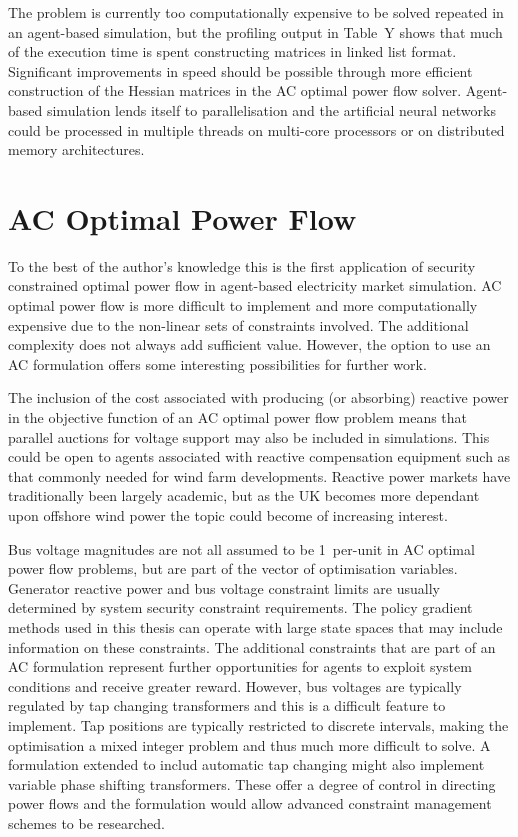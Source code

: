 The problem is currently too computationally expensive to be
solved repeated in an agent-based simulation, but the profiling output in
Table~Y shows that much of the execution time is spent constructing matrices in
linked list format.  Significant improvements in speed should be possible
through more efficient construction of the Hessian matrices in the AC optimal
power flow solver.  Agent-based simulation lends itself to parallelisation and
the artificial neural networks could be processed in multiple threads on
multi-core processors or on distributed memory architectures.

\section{AC Optimal Power Flow}
To the best of the author's knowledge this is the first application of security
constrained optimal power flow in agent-based electricity market simulation.
AC optimal power flow is more difficult to implement and more computationally
expensive due to the non-linear sets of constraints involved.  The
additional complexity does not always add sufficient value. However, the
option to use an AC formulation offers some interesting possibilities for
further work.

The inclusion of the cost associated with producing (or absorbing) reactive
power in the objective function of an AC optimal power flow problem means that
parallel auctions for voltage support may also be included in simulations.
This could be open to agents associated with reactive compensation equipment such as that commonly
needed for wind farm developments.  Reactive power markets have traditionally
been largely academic, but as the UK becomes more dependant upon
offshore wind power the topic could become of increasing interest.

Bus voltage magnitudes are not all assumed to be 1~per-unit in AC optimal power
flow problems, but are part of the vector of optimisation variables.  Generator
reactive power and bus voltage constraint limits are usually determined by system
security constraint requirements.  The policy gradient methods used in this
thesis can operate with large state spaces that may include information on
these constraints.  The additional constraints that are part of an AC
formulation represent further opportunities for agents to exploit system
conditions and receive greater reward.  However, bus voltages are typically
regulated by tap changing transformers and this is a difficult feature to
implement.  Tap positions are typically restricted to discrete intervals,
making the optimisation a mixed integer problem and thus much more difficult
to solve.  A formulation extended to includ automatic tap changing might also
implement variable phase shifting transformers.  These offer a degree of
control in directing power flows and the formulation would allow advanced
constraint management schemes to be researched.


